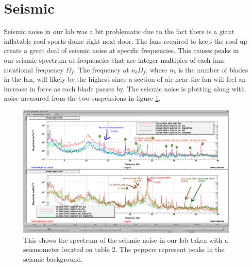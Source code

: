 \section{Seismic}
\label{sec:seismic}

Seismic noise in our lab was a bit problematic due to the fact there is a giant
inflatable roof sports dome right next door. The fans required to keep the roof
up create a great deal of seismic noise at specific frequencies.
This causes peaks in our seismic spectrum at frequencies that are integer
multiples of each fans rotational frequency $\Omega_f$.
The frequency at $n_b\Omega_f$, where $n_b$ is the number of blades in the fan,
will likely be the highest since a section of air near the fan will feel an
increase in force as each blade passes by. The seismic noise is plotting along
with noise measured from the two suspensions in figure \ref{fig:seismic}.


\begin{figure}[hb]
  \centering
  \includegraphics[width=16cm]{./figures/modehunting.png}
  \caption[Seismic Noise Spectrum]{
    This shows the spectrum of the seismic noise in our lab taken with a
    seismometer located on table 2.
    The peppers represent peaks in the seismic background.
    }
  \label{fig:seismic}
\end{figure}



